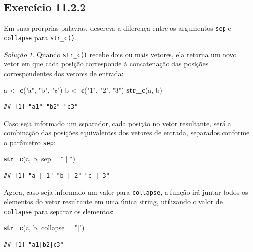 \documentclass[
]{latex/krantz}
\newenvironment{Shaded}{\begin{snugshade}}{\end{snugshade}}
\newcommand{\AttributeTok}[1]{\textcolor[rgb]{0.13,0.29,0.53}{#1}}
\newcommand{\FunctionTok}[1]{\textcolor[rgb]{0.13,0.29,0.53}{\textbf{#1}}}
\newcommand{\NormalTok}[1]{#1}
\newcommand{\OtherTok}[1]{\textcolor[rgb]{0.56,0.35,0.01}{#1}}
\newcommand{\StringTok}[1]{\textcolor[rgb]{0.31,0.60,0.02}{#1}}
\theoremstyle{definition}
\theoremstyle{definition}
\theoremstyle{definition}
\theoremstyle{definition}
\theoremstyle{remark}
\newtheorem*{solution}{Solução}
\begin{document}
\hypertarget{exr11-2-2}{%
\subsection*{Exercício 11.2.2}\label{exr11-2-2}}

Em suas prórprias palavras, descreva a diferença entre os argumentos \texttt{sep} e \texttt{collapse} para \texttt{str\_c()}.

\begin{solution}

Quando \texttt{str\_c()} recebe dois ou mais vetores, ela retorna um novo vetor em que cada posição corresponde à concatenação das posições correspondentes dos vetores de entrada:

\begin{Shaded}
\begin{Highlighting}[]
\NormalTok{a }\OtherTok{\textless{}{-}} \FunctionTok{c}\NormalTok{(}\StringTok{"a"}\NormalTok{, }\StringTok{"b"}\NormalTok{, }\StringTok{"c"}\NormalTok{)}
\NormalTok{b }\OtherTok{\textless{}{-}} \FunctionTok{c}\NormalTok{(}\StringTok{"1"}\NormalTok{, }\StringTok{"2"}\NormalTok{, }\StringTok{"3"}\NormalTok{)}
\FunctionTok{str\_c}\NormalTok{(a, b)}
\end{Highlighting}
\end{Shaded}

\begin{verbatim}
## [1] "a1" "b2" "c3"
\end{verbatim}

Caso seja informado um separador, cada posição no vetor resultante, será a combinação das posições equivalentes dos vetores de entrada, separados conforme o parâmetro \texttt{sep}:

\begin{Shaded}
\begin{Highlighting}[]
\FunctionTok{str\_c}\NormalTok{(a, b, }\AttributeTok{sep =} \StringTok{" | "}\NormalTok{)}
\end{Highlighting}
\end{Shaded}

\begin{verbatim}
## [1] "a | 1" "b | 2" "c | 3"
\end{verbatim}

Agora, caso seja informado um valor para \texttt{collapse}, a função irá juntar todos os elementos do vetor resultante em uma única string, utilizando o valor de \texttt{collapse} para separar os elementos:

\begin{Shaded}
\begin{Highlighting}[]
\FunctionTok{str\_c}\NormalTok{(a, b, }\AttributeTok{collapse =} \StringTok{"|"}\NormalTok{)}
\end{Highlighting}
\end{Shaded}

\begin{verbatim}
## [1] "a1|b2|c3"
\end{verbatim}

\end{solution}
\end{document}
